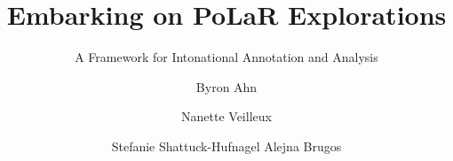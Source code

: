 \title{Embarking on PoLaR Explorations}
\subtitle{A Framework for Intonational Annotation and Analysis}
\author{Byron Ahn \and Nanette Veilleux \and Stefanie Shattuck-Hufnagel \lastand Alejna Brugos}
\renewcommand{\lsSeries}{sidl}%
\renewcommand{\lsSeriesNumber}{}
